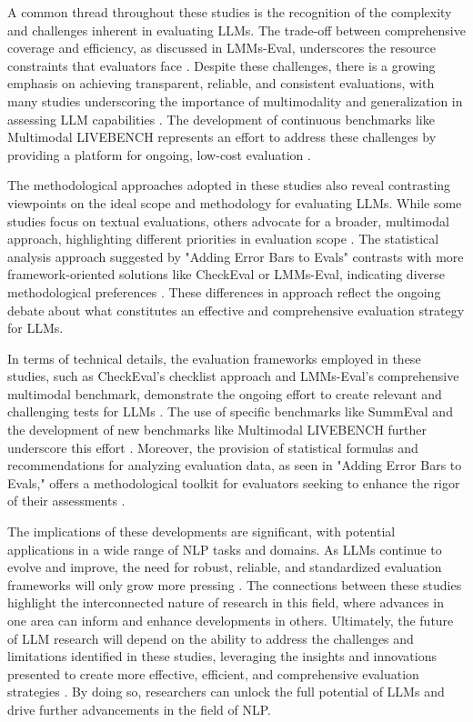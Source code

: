 \documentclass[conference]{IEEEtran}
\begin{document}
A common thread throughout these studies is the recognition of the complexity and challenges inherent in evaluating LLMs. The trade-off between comprehensive coverage and efficiency, as discussed in LMMs-Eval, underscores the resource constraints that evaluators face \cite{b4}. Despite these challenges, there is a growing emphasis on achieving transparent, reliable, and consistent evaluations, with many studies underscoring the importance of multimodality and generalization in assessing LLM capabilities \cite{b7}. The development of continuous benchmarks like Multimodal LIVEBENCH represents an effort to address these challenges by providing a platform for ongoing, low-cost evaluation \cite{b8}.

The methodological approaches adopted in these studies also reveal contrasting viewpoints on the ideal scope and methodology for evaluating LLMs. While some studies focus on textual evaluations, others advocate for a broader, multimodal approach, highlighting different priorities in evaluation scope \cite{b9}. The statistical analysis approach suggested by "Adding Error Bars to Evals" contrasts with more framework-oriented solutions like CheckEval or LMMs-Eval, indicating diverse methodological preferences \cite{b10}. These differences in approach reflect the ongoing debate about what constitutes an effective and comprehensive evaluation strategy for LLMs.

In terms of technical details, the evaluation frameworks employed in these studies, such as CheckEval's checklist approach and LMMs-Eval's comprehensive multimodal benchmark, demonstrate the ongoing effort to create relevant and challenging tests for LLMs \cite{b11}. The use of specific benchmarks like SummEval and the development of new benchmarks like Multimodal LIVEBENCH further underscore this effort \cite{b12}. Moreover, the provision of statistical formulas and recommendations for analyzing evaluation data, as seen in "Adding Error Bars to Evals," offers a methodological toolkit for evaluators seeking to enhance the rigor of their assessments \cite{b13}.

The implications of these developments are significant, with potential applications in a wide range of NLP tasks and domains. As LLMs continue to evolve and improve, the need for robust, reliable, and standardized evaluation frameworks will only grow more pressing \cite{b14}. The connections between these studies highlight the interconnected nature of research in this field, where advances in one area can inform and enhance developments in others. Ultimately, the future of LLM research will depend on the ability to address the challenges and limitations identified in these studies, leveraging the insights and innovations presented to create more effective, efficient, and comprehensive evaluation strategies \cite{b15}. By doing so, researchers can unlock the full potential of LLMs and drive further advancements in the field of NLP.
\end{document}
